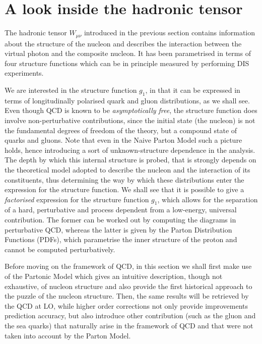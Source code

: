 \section{A look inside the hadronic tensor}
The hadronic tensor $W_{\mu \nu}$ introduced in the previous section contains information about the structure of the nucleon and describes the interaction between the virtual photon and the composite nucleon. It has been parametrised in terms of four structure functions which can be in principle measured by performing DIS experiments.\par
We are interested in the structure function $g_1$, in that it can be expressed in terms of longitudinally polarised quark and gluon distributions, as we shall see. Even though QCD is known to be \textit{asymptotically free}, the structure function does involve non-perturbative contributions, since the initial state (the nucleon) is not the fundamental degrees of freedom of the theory, but a compound state of quarks and gluons. Note that even in the Naive Parton Model such a picture holds, hence introducing a sort of unknown-structure dependence in the analysis. The depth by which this internal structure is probed, that is strongly depends on the theoretical model adopted to describe the nucleon and the interaction of its constituents, thus determining the way by which these distributions enter the expression for the structure function. We shall see that it is possible to give a \textit{factorised} expression for the structure function $g_1$, which allows for the separation of a hard, perturbative and process dependent from a low-energy, universal contribution. The former can be worked out by computing the diagrams in perturbative QCD, whereas the latter is given by the Parton Distribution Functions (PDFs), which parametrise the inner structure of the proton and cannot be computed perturbatively.\par
Before moving on the framework of QCD, in this section we shall first make use of the Partonic Model which gives an intuitive description, though not exhaustive, of nucleon structure and also provide the first historical approach to the puzzle of the nucleon structure. Then, the same results will be retrieved by the QCD at LO, while higher order corrections not only provide improvements prediction accuracy, but also introduce other contribution (such as the gluon and the sea quarks) that naturally arise in the framework of QCD and that were not taken into account by the Parton Model. 



